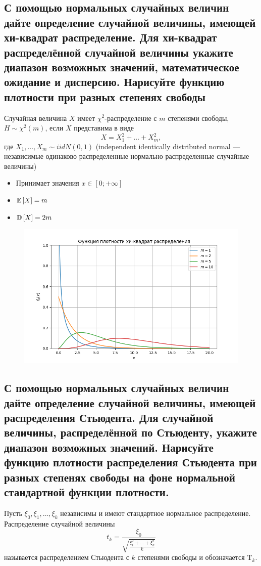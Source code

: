 \documentclass{article}
\begin{document}
\newpage
\subsection{С помощью нормальных случайных величин дайте определение случайной величины, имеющей хи-квадрат распределение. Для хи-квадрат распределённой случайной величины укажите диапазон возможных значений, математическое ожидание и дисперсию. Нарисуйте функцию плотности при разных степенях свободы}
 Случайная величина $X$ имеет $\chi^2$-распределение с $m$ степенями свободы, $H\sim\chi^2(m)$, если $X$ представима в виде
\begin{equation*}
    X=X_1^2+\ldots+X_m^2,
\end{equation*}
где $X_1,\ldots,X_m\sim iidN(0,1)$ (independent identically distributed normal — независимые одинаково распределенные нормально распределенные случайные величины)
\begin{itemize}
    \item Принимает значения $x\in[0;+\infty]$
    \item $\mathbb{E}\left[X\right]=m$
    \item $\mathbb{D}\left[X\right]=2m$
\end{itemize}
\begin{figure}[h]
    \centering
    \includegraphics[width=0.8\linewidth]{chi.png}
\end{figure}

\newpage
\subsection{С помощью нормальных случайных величин дайте определение случайной величины, имеющей распределения Стьюдента. Для случайной величины, распределённой по Стьюденту, укажите диапазон возможных значений. Нарисуйте функцию плотности распределения Стьюдента при разных степенях свободы на фоне нормальной стандартной функции плотности.}
 Пусть $\xi_0, \xi_1, \ldots, \xi_k$ независимы и имеют стандартное нормальное распределение. Распределение случайной величины
$$
t_k=\frac{\xi_0}{\sqrt{\frac{\xi_1^2+\ldots+\xi_k^2}{k}}}
$$
называется распределением Стьюдента с $k$ степенями свободы и обозначается $\mathrm{T}_k$.
\end{document}
